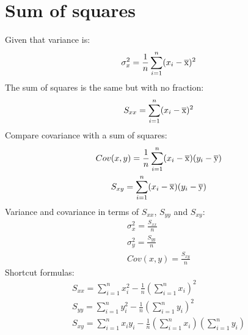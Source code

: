 \documentclass{article}
\begin{document}
\section{Sum of squares}
Given that variance is:
\begin{equation}
  \sigma^2_x = \frac{1}{n} \sum_{i=1}^n(x_i - \overline{\rm x})^2
\end{equation}
The sum of squares is the same but with no fraction:
\begin{equation}
  S_{xx} = \sum_{i=1}^n(x_i - \overline{\rm x})^2
\end{equation}
Compare covariance with a sum of squares:
\begin{equation}
  \begin{gathered}
    Cov(x,y) = \frac{1}{n} \sum_{i=1}^n(x_i - \overline{\rm x})(y_i - \overline{\rm y}) \\
    S_{xy} = \sum_{i=1}^n(x_i - \overline{\rm x})(y_i - \overline{\rm y})
  \end{gathered}
\end{equation}
Variance and covariance in terms of $S_{xx}$, $S_{yy}$ and $S_{xy}$:
\begin{equation}
  \begin{gathered}
    \sigma^2_x = \frac{S_{xx}}{n} \\
    \sigma^2_y = \frac{S_{yy}}{n} \\
    Cov(x,y) = \frac{S_{xy}}{n}
  \end{gathered}
\end{equation}
Shortcut formulas:
\begin{equation}
  \begin{gathered}
    S_{xx} = \sum_{i=1}^n x_i^2 - \frac{1}{n} (\sum_{i=1}^n x_i)^2 \\
    S_{yy} = \sum_{i=1}^n y_i^2 - \frac{1}{n} (\sum_{i=1}^n y_i)^2 \\
    S_{xy} = \sum_{i=1}^n x_iy_i - \frac{1}{n} (\sum_{i=1}^n x_i)(\sum_{i=1}^n y_i)
  \end{gathered}
\end{equation}
\end{document}
